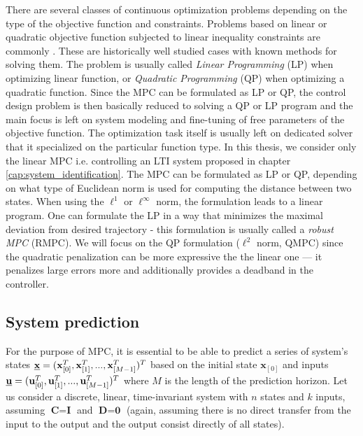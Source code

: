 There are several classes of continuous optimization problems depending on the type of the objective function and constraints. Problems based on linear or quadratic objective function subjected to linear inequality constraints are commonly . These are historically well studied cases with known methods for solving them. The problem is usually called \textit{Linear Programming} (LP) when optimizing linear function, or \textit{Quadratic Programming} (QP) when optimizing a quadratic function. Since the MPC can be formulated as LP or QP, the control design problem is then basically reduced to solving a QP or LP program and the main focus is left on system modeling and fine-tuning of free parameters of the objective function. The optimization task itself is usually left on dedicated solver that it specialized on the particular function type. In this thesis, we consider only the linear MPC i.e. controlling an LTI system proposed in chapter \ref{cap:system_identification}. The MPC can be formulated as LP or QP, depending on what type of Euclidean norm is used for computing the distance between two states. When using the \mbox{\emph{$\ell^1$}} or \mbox{\emph{$\ell^\infty$}} norm, the formulation leads to a linear program. One can formulate the LP in a way that minimizes the maximal deviation from desired trajectory - this formulation is usually called a \emph{robust MPC} (RMPC). We will focus on the QP formulation (\mbox{\emph{$\ell^2$}} norm, QMPC) since the quadratic penalization can be more expressive the the linear one --- it penalizes large errors more and additionally provides a deadband in the controller.

\subsection{System prediction}

For the purpose of MPC, it is essential to be able to predict a series of system's states $\textbf{\underline{x}} = (\textbf{x}_{[0]}^T, \textbf{x}_{[1]}^T, ..., \textbf{x}_{[M-1]}^T)^T$ based on the initial state $\textbf{x}_{[0]}$ and inputs $\textbf{\underline{u}} = (\textbf{u}_{[0]}^T, \textbf{u}_{[1]}^T, ..., \textbf{u}_{[M-1]}^T)^T$ where $M$ is the length of the prediction horizon. Let us consider a discrete, linear, time-invariant system with $n$ states and $k$ inputs, assuming $\textbf{C} = \textbf{I}$ and $\textbf{D} = \textbf{0}$ (again, assuming there is no direct transfer from the input to the output and the output consist directly of all states).

